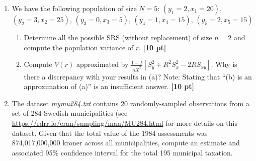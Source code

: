 \documentclass[12pt]{article}
\begin{document}
\begin{enumerate}
	\begin{enumerate}
		\item Estimate the percentage of students who routinely vape in this region, along with a 95\% confidence interval. You may assume equal clusters and sample sizes corresponding to the mean cluster size and sample size in the four schools. {\bf [10 pt]}
		\item The researcher now wants to study the prevalence of vaping among high school students in a different region with 35 high schools. She will sample $k$ schools and interview $m$ students at each school, and can afford to spend 300 hours on the project.  Assuming that it will take 20 hours to recruit a school into the sample and travel to the school and 30 minutes to interview each student (accounting for no shows and other administrative tasks), propose values of $k$ and $m$ for an optimal sample design using the results from (a). {\bf [15 pt]}
	\end{enumerate}

\item We have the following population of size $N=5$: $(y_1 = 2, x_1 = 20)$, $(y_2 = 3, x_2 = 25)$, $(y_3 = 0, x_3 = 5)$, $(y_4 = 1, x_4 = 15)$, $(y_5 = 2, x_5 = 15)$
	\begin{enumerate}
		\item Determine all the possible SRS (without replacement) of size $n=2$ and compute the population variance of $r$. {\bf [10 pt]}
		\item Compute $V(r)$ approximated by $\frac{1-f}{n \bar X^2} \left[ S_y^2 + R^2 S_x^2 - 2 R S_{xy} \right]$.  Why is there a discrepancy with your results in (a)? Note: Stating that ``(b) is an approximation of (a)'' is an insufficient answer. {\bf [10 pt]}
	\end{enumerate}
\item The dataset \emph{mymu284.txt} contains 20 randomly-sampled observations from a set of 284 Swedish municipalities (see \url{https://rdrr.io/cran/sampling/man/MU284.html} for more details on this dataset. Given that the total value of the 1984 assessments was 874,017,000,000 kroner across all municipalities, compute an estimate and associated 95\% confidence interval for the total 195 municipal taxation.

\end{enumerate}
\end{document}
